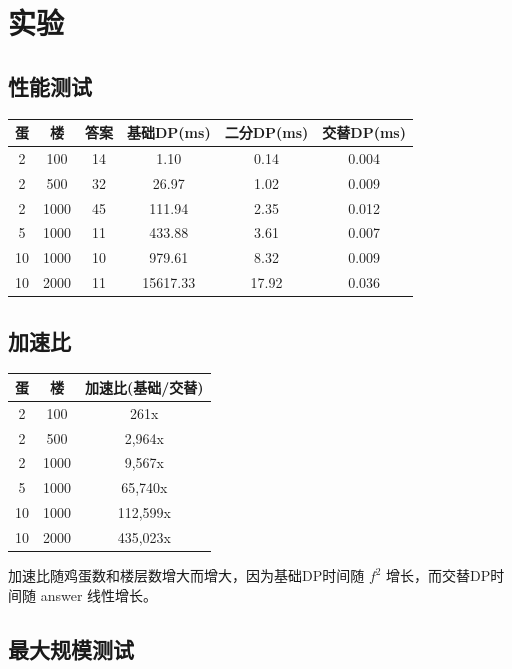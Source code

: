 \documentclass[12pt,a4paper]{article}
\begin{document}
\section{实验}

\subsection{性能测试}

\begin{table}[H]
\centering
\begin{tabular}{@{}cccccc@{}}
\toprule
\textbf{蛋} & \textbf{楼} & \textbf{答案} & \textbf{基础DP(ms)} & \textbf{二分DP(ms)} & \textbf{交替DP(ms)} \\
\midrule
2 & 100 & 14 & 1.10 & 0.14 & 0.004 \\
2 & 500 & 32 & 26.97 & 1.02 & 0.009 \\
2 & 1000 & 45 & 111.94 & 2.35 & 0.012 \\
5 & 1000 & 11 & 433.88 & 3.61 & 0.007 \\
10 & 1000 & 10 & 979.61 & 8.32 & 0.009 \\
10 & 2000 & 11 & 15617.33 & 17.92 & 0.036 \\
\bottomrule
\end{tabular}
\end{table}

\subsection{加速比}

\begin{table}[H]
\centering
\begin{tabular}{@{}ccc@{}}
\toprule
\textbf{蛋} & \textbf{楼} & \textbf{加速比(基础/交替)} \\
\midrule
2 & 100 & 261x \\
2 & 500 & 2,964x \\
2 & 1000 & 9,567x \\
5 & 1000 & 65,740x \\
10 & 1000 & 112,599x \\
10 & 2000 & 435,023x \\
\bottomrule
\end{tabular}
\end{table}

加速比随鸡蛋数和楼层数增大而增大，因为基础DP时间随 $f^2$ 增长，而交替DP时间随 answer 线性增长。

\subsection{最大规模测试}
\end{document}
